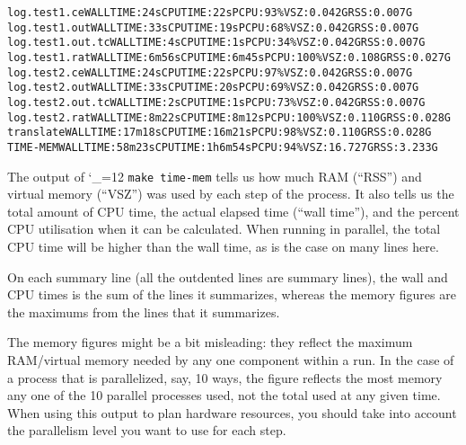 \documentclass[11pt,letterpaper]{article}
\def\code{\begingroup\catcode`\_=12 \codex}
\newcommand{\codex}[1]{\texttt{#1}\endgroup}
\begin{document}
\begin{tiny}
\begin{alltt}
      log.test1.ce                                        WALL TIME: 24s      CPU TIME: 22s       PCPU: 93\%    VSZ: 0.042G    RSS: 0.007G
      log.test1.out                                       WALL TIME: 33s      CPU TIME: 19s       PCPU: 68\%    VSZ: 0.042G    RSS: 0.007G
      log.test1.out.tc                                    WALL TIME: 4s       CPU TIME: 1s        PCPU: 34\%    VSZ: 0.042G    RSS: 0.007G
      log.test1.rat                                       WALL TIME: 6m56s    CPU TIME: 6m45s     PCPU: 100\%   VSZ: 0.108G    RSS: 0.027G
      log.test2.ce                                        WALL TIME: 24s      CPU TIME: 22s       PCPU: 97\%    VSZ: 0.042G    RSS: 0.007G
      log.test2.out                                       WALL TIME: 33s      CPU TIME: 20s       PCPU: 69\%    VSZ: 0.042G    RSS: 0.007G
      log.test2.out.tc                                    WALL TIME: 2s       CPU TIME: 1s        PCPU: 73\%    VSZ: 0.042G    RSS: 0.007G
      log.test2.rat                                       WALL TIME: 8m22s    CPU TIME: 8m12s     PCPU: 100\%   VSZ: 0.110G    RSS: 0.028G
   translate                                              WALL TIME: 17m18s   CPU TIME: 16m21s    PCPU: 98\%    VSZ: 0.110G    RSS: 0.028G
TIME-MEM                                                  WALL TIME: 58m23s   CPU TIME: 1h6m54s   PCPU: 94\%    VSZ: 16.727G   RSS: 3.233G
\end{alltt}
\end{tiny}

The output of \code{make time-mem} tells us how much RAM (``RSS'') and
virtual memory (``VSZ'') was used by each step of the process. It also tells us
the total amount of CPU time, the actual elapsed time (``wall time''), and the
percent CPU utilisation when it can be calculated.  When
running in parallel, the total CPU time will be higher than the wall time, as is
the case on many lines here.

On each summary line (all the outdented lines are summary lines),
the wall and CPU times is the sum of the
lines it summarizes, whereas the memory figures are the maximums from
the lines that it summarizes.

The memory figures might be a bit misleading: they reflect the maximum
RAM/virtual memory needed by any one component within a run.  In the case of a
process that is parallelized, say, 10 ways, the figure reflects the most memory
any one of the 10 parallel processes used, not the total used at any given
time.  When using this output to plan hardware resources, you should take into
account the parallelism level you want to use for each step.
\end{document}
